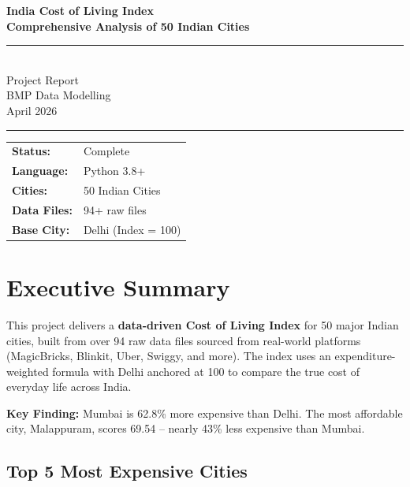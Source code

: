 \documentclass[12pt,a4paper]{article}
\begin{document}
\begin{titlepage}
  \centering
  \vspace*{2cm}
  {\Huge\bfseries\color{headerblue} India Cost of Living Index\\[0.4cm]}
  {\Large\bfseries Comprehensive Analysis of 50 Indian Cities\\[0.8cm]}
  \rule{\linewidth}{0.5pt}\\[0.6cm]
  {\large Project Report}\\[0.4cm]
  {\large BMP Data Modelling}\\[0.4cm]
  {\large April 2026}\\[1cm]
  \rule{\linewidth}{0.5pt}
  \vfill
  \begin{tabular}{ll}
    \textbf{Status:}   & Complete \\
    \textbf{Language:} & Python 3.8+ \\
    \textbf{Cities:}   & 50 Indian Cities \\
    \textbf{Data Files:} & 94+ raw files \\
    \textbf{Base City:} & Delhi (Index = 100) \\
  \end{tabular}
\end{titlepage}

\tableofcontents
\newpage

\section{Executive Summary}

This project delivers a \textbf{data-driven Cost of Living Index} for 50 major Indian cities,
built from over 94 raw data files sourced from real-world platforms (MagicBricks, Blinkit,
Uber, Swiggy, and more). The index uses an expenditure-weighted formula with Delhi anchored
at 100 to compare the true cost of everyday life across India.

\textbf{Key Finding:} Mumbai is 62.8\% more expensive than Delhi. The most affordable city,
Malappuram, scores 69.54 -- nearly 43\% less expensive than Mumbai.

\subsection{Top 5 Most Expensive Cities}
\end{document}

